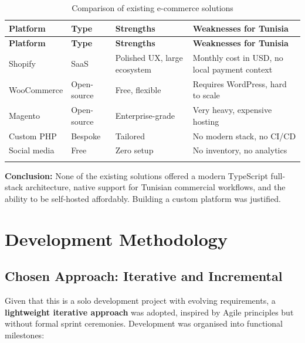 \begin{longtable}{|m{2.5cm}|m{1.8cm}|m{4.8cm}|m{5.2cm}|}
    \hline
    \textbf{Platform} & \textbf{Type} & \textbf{Strengths}           & \textbf{Weaknesses for Tunisia}               \\
    \hline
    \endfirsthead
    \hline
    \textbf{Platform} & \textbf{Type} & \textbf{Strengths}           & \textbf{Weaknesses for Tunisia}               \\
    \hline
    \endhead
    \hline
    \endfoot
    \hline
    \endlastfoot
    Shopify           & SaaS          & Polished UX, large ecosystem & Monthly cost in USD, no local payment context \\
    \hline
    WooCommerce       & Open-source   & Free, flexible               & Requires WordPress, hard to scale             \\
    \hline
    Magento           & Open-source   & Enterprise-grade             & Very heavy, expensive hosting                 \\
    \hline
    Custom PHP        & Bespoke       & Tailored                     & No modern stack, no CI/CD                     \\
    \hline
    Social media      & Free          & Zero setup                   & No inventory, no analytics                    \\
    \hline
    \caption{Comparison of existing e-commerce solutions}
    \label{tab:existing_solutions}
\end{longtable}

\textbf{Conclusion:} None of the existing solutions offered a modern TypeScript
full-stack architecture, native support for Tunisian commercial workflows, and the
ability to be self-hosted affordably. Building a custom platform was justified.

\section{Development Methodology}

\subsection{Chosen Approach: Iterative and Incremental}

Given that this is a solo development project with evolving requirements, a
\textbf{lightweight iterative approach} was adopted, inspired by Agile principles
but without formal sprint ceremonies. Development was organised into functional
milestones:

